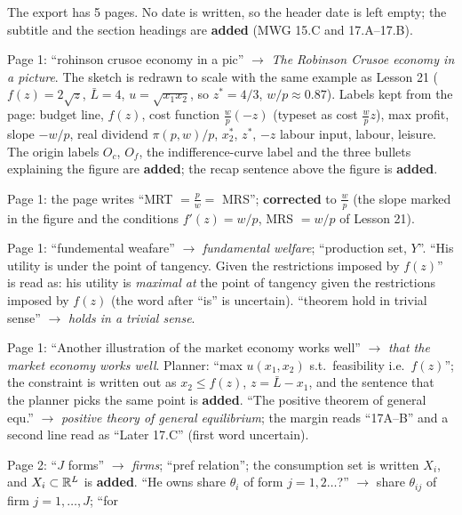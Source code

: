 \documentclass[11pt]{article}
\begin{document}
\begin{transcriptnotes}
  \item The export has 5 pages. No date is written, so the header date is left empty; the
        subtitle and the section headings are \textbf{added} (MWG 15.C and 17.A--17.B).
  \item Page 1: ``rohinson crusoe economy in a pic'' $\to$ \emph{The Robinson Crusoe economy
        in a picture}. The sketch is redrawn to scale with the same example as Lesson 21
        ($f(z)=2\sqrt z$, $\bar L=4$, $u=\sqrt{x_1x_2}$, so $z^*=4/3$, $w/p\approx0.87$).
        Labels kept from the page: budget line, $f(z)$, cost function $\frac wp(-z)$
        (typeset as cost $\frac wp z$), max profit, slope $-w/p$, real dividend
        $\pi(p,w)/p$, $x_2^*$, $z^*$, $-z$ labour input, labour, leisure. The origin labels
        $O_c$, $O_f$, the indifference-curve label and the three bullets explaining the
        figure are \textbf{added}; the recap sentence above the figure is \textbf{added}.
  \item Page 1: the page writes ``MRT $=\frac pw=$ MRS''; \textbf{corrected} to
        $\frac wp$ (the slope marked in the figure and the conditions $f'(z)=w/p$,
        MRS $=w/p$ of Lesson 21).
  \item Page 1: ``fundemental weafare'' $\to$ \emph{fundamental welfare}; ``production set,
        $Y$''. ``His utility is under the point of tangency. Given the restrictions imposed
        by $f(z)$'' is read as: his utility is \emph{maximal at} the point of tangency given
        the restrictions imposed by $f(z)$ (the word after ``is'' is uncertain). ``theorem
        hold in trivial sense'' $\to$ \emph{holds in a trivial sense}.
  \item Page 1: ``Another illustration of the market economy works well'' $\to$
        \emph{that the market economy works well}. Planner: ``max $u(x_1,x_2)$ s.t.\
        feasibility i.e.\ $f(z)$''; the constraint is written out as $x_2\le f(z)$,
        $z=\bar L-x_1$, and the sentence that the planner picks the same point is
        \textbf{added}. ``The positive theorem of general equ.'' $\to$ \emph{positive
        theory of general equilibrium}; the margin reads ``17A--B'' and a second line read
        as ``Later 17.C'' (first word uncertain).
  \item Page 2: ``$J$ forms'' $\to$ \emph{firms}; ``pref relation''; the consumption set is
        written $X_i$, and $X_i\subset\mathbb{R}^L$ is \textbf{added}. ``He owns share $\theta_i$
        of form $j=1,2\dots$?'' $\to$ share $\theta_{ij}$ of firm $j=1,\dots,J$; ``for

\end{transcriptnotes}
\end{document}
